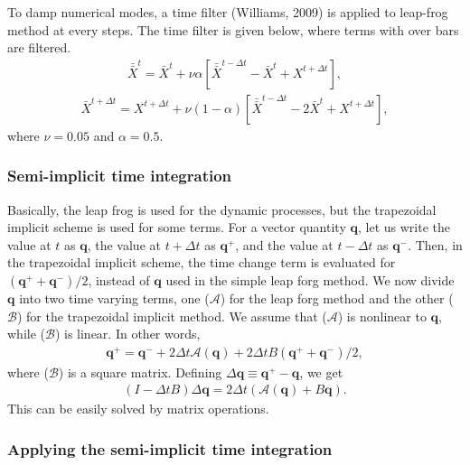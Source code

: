 To damp numerical modes, a time filter (Williams, 2009) is applied to
leap-frog method at every steps.
The time filter is given below, where terms with over bars are filtered.
\begin{eqnarray}
\bar{\bar{X}}^{t} = \bar{X}^{t} + \nu \alpha [\bar{\bar{X}}^{t-\Delta t} - \bar{X}^{t} + X^{t+\Delta t}],
\end{eqnarray} \begin{eqnarray}
\bar{X}^{t+\Delta t} = X^{t+\Delta t} + \nu (1-\alpha) [\bar{\bar{X}}^{t-\Delta t} - 2 \bar{X}^{t} + X^{t+\Delta t}],
\end{eqnarray}
where \(\nu=0.05\) and \(\alpha=0.5\).

\hypertarget{semi-implicit-time-integration}{%
\subsubsection{Semi-implicit time
integration}\label{semi-implicit-time-integration}}

Basically, the leap frog is used for the dynamic processes, but the
trapezoidal implicit scheme is used for some terms. For a vector
quantity \({\mathbf q}\), let us write the value at \(t\) as
\({\mathbf q}\), the value at \(t+\Delta t\) as \({\mathbf q}^+\), and
the value at \(t-\Delta t\) as \({\mathbf q}^-\). Then, in the
trapezoidal implicit scheme, the time change term is evaluated for
\(({\mathbf q}^+ + {\mathbf q}^- )/2\), instead of \({\mathbf q}\) used
in the simple leap forg method. We now divide \({\mathbf q}\) into two
time varying terms, one (\({\mathcal A}\)) for the leap forg method and
the other (\({\mathcal B}\)) for the trapezoidal implicit method. We
assume that (\({\mathcal A}\)) is nonlinear to \({\mathbf q}\), while
(\({\mathcal B}\)) is linear. In other words,
\begin{eqnarray}
  {\mathbf q}^+ 
      = {\mathbf q}^- 
      + 2 \Delta t {\mathcal A}( {\mathbf q}  )
      + 2 \Delta t B (   {\mathbf q}^+ 
                       + {\mathbf q}^-   )/2,
\end{eqnarray}
where (\({\mathcal B}\)) is a square matrix. Defining
\(\Delta {\mathbf q} \equiv {\mathbf q}^+ - {\mathbf q}\), we get
\begin{eqnarray}
  ( I - \Delta t B ) \Delta {\mathbf q} 
      = 2 \Delta t \left( {\mathcal A}({\mathbf q})
                         + B {\mathbf q} \right).
\end{eqnarray}
This can be easily solved by matrix operations.

\hypertarget{applying-the-semi-implicit-time-integration}{%
\subsubsection{Applying the semi-implicit time
integration}\label{applying-the-semi-implicit-time-integration}}

